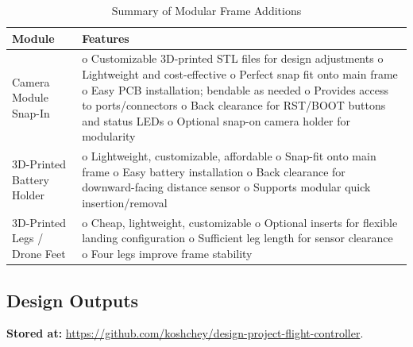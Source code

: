 \begin{table}[H]
\centering
\begin{tabular}{|p{3cm}|p{11cm}|}
\hline
\textbf{Module} & \textbf{Features} \\
\hline
Camera Module Snap-In &
o Customizable 3D-printed STL files for design adjustments \newline
o Lightweight and cost-effective \newline
o Perfect snap fit onto main frame \newline
o Easy PCB installation; bendable as needed \newline
o Provides access to ports/connectors \newline
o Back clearance for RST/BOOT buttons and status LEDs \newline
o Optional snap-on camera holder for modularity \\
\hline
3D-Printed Battery Holder & 
o Lightweight, customizable, affordable \newline
o Snap-fit onto main frame \newline
o Easy battery installation \newline
o Back clearance for downward-facing distance sensor \newline
o Supports modular quick insertion/removal \\
\hline
3D-Printed Legs / Drone Feet & 
o Cheap, lightweight, customizable \newline
o Optional inserts for flexible landing configuration \newline
o Sufficient leg length for sensor clearance \newline
o Four legs improve frame stability \\
\hline
\end{tabular}
\caption{Summary of Modular Frame Additions}
\label{tab:frame-add-summary}
\end{table}

\pagebreak
\subsection{Design Outputs}

\textbf{Stored at:} \url{https://github.com/koshchey/design-project-flight-controller}.

